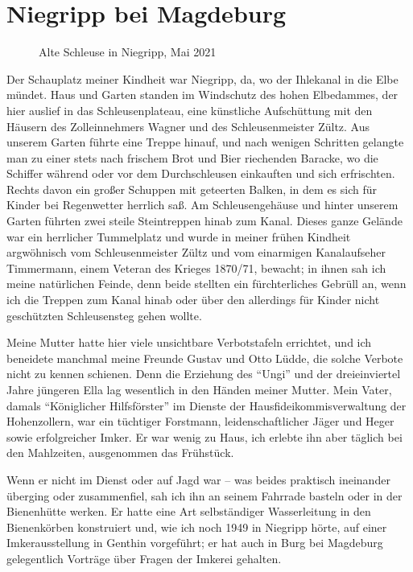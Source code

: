 \section{Niegripp bei Magdeburg}

\begin{figure}[h]
	\caption{Alte Schleuse in Niegripp, Mai 2021}
	\label{fig:schleuse_niegripp}
\end{figure}

Der Schauplatz meiner Kindheit war Niegripp, da, wo der Ihlekanal in die Elbe mündet. Haus und Garten standen im Windschutz des hohen Elbedammes, der hier auslief in das Schleusenplateau, eine künstliche Aufschüttung mit den Häusern des Zolleinnehmers Wagner und des Schleusenmeister Zültz. Aus unserem Garten führte eine Treppe hinauf, und nach wenigen Schritten gelangte man zu einer stets nach frischem Brot und Bier riechenden Baracke, wo die Schiffer während oder vor dem Durchschleusen einkauften und sich erfrischten. Rechts davon ein großer Schuppen mit geteerten Balken, in dem es sich für Kinder bei Regenwetter herrlich saß. Am Schleusengehäuse und hinter unserem Garten führten zwei steile Steintreppen hinab zum Kanal. Dieses ganze Gelände war ein herrlicher Tummelplatz und wurde in meiner frühen Kindheit argwöhnisch vom Schleusenmeister Zültz und vom einarmigen Kanalaufseher Timmermann, einem Veteran des Krieges 1870/71, bewacht; in ihnen sah ich meine natürlichen Feinde, denn beide stellten ein fürchterliches Gebrüll an, wenn ich die Treppen zum Kanal hinab oder über den allerdings für Kinder nicht geschützten Schleusensteg gehen wollte.

Meine Mutter hatte hier viele unsichtbare Verbotstafeln errichtet, und ich beneidete manchmal meine Freunde Gustav und Otto Lüdde, die solche Verbote nicht zu kennen schienen. Denn die Erziehung des \enquote{Ungi} und der dreieinviertel Jahre jüngeren Ella lag wesentlich in den Händen meiner Mutter. Mein Vater, damals \enquote{Königlicher Hilfsförster} im Dienste der Hausfideikommisverwaltung der Hohenzollern, war ein tüchtiger Forstmann, leidenschaftlicher Jäger und Heger sowie erfolgreicher Imker. Er war wenig zu Haus, ich erlebte ihn aber täglich bei den Mahlzeiten, ausgenommen das Frühstück.

Wenn er nicht im Dienst oder auf Jagd war -- was beides praktisch ineinander überging oder zusammenfiel, sah ich ihn an seinem Fahrrade basteln oder in der Bienenhütte werken. Er hatte eine Art selbständiger Wasserleitung in den Bienenkörben konstruiert und, wie ich noch 1949 in Niegripp hörte, auf einer Imkerausstellung in Genthin vorgeführt; er hat auch in Burg bei Magdeburg gelegentlich Vorträge über Fragen der Imkerei gehalten.

